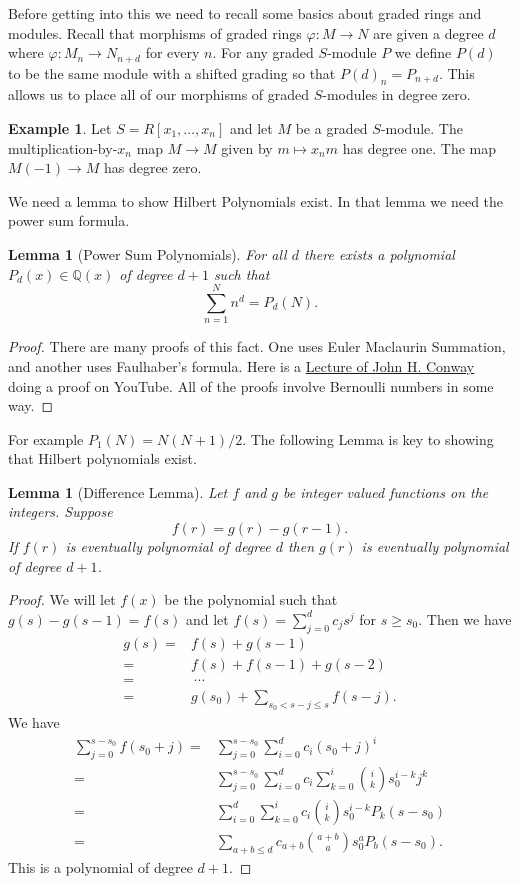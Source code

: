 \documentclass[12pt]{book}
\numberwithin{equation}{section}
\newtheorem{lemma}[theorem]{Lemma}
\theoremstyle{definition}
\newtheorem{example}[theorem]{Example}
\theoremstyle{remark}
\newcommand{\QQ}{\mathbb{Q}}
\begin{document}
Before getting into this we need to recall some basics about graded rings and modules.
Recall that morphisms of graded rings $\varphi:M\to N$ are given a degree $d$ where $\varphi: M_n \to N_{n+d}$ for every $n$. 
For any graded $S$-module $P$ we define $P(d)$ to be the same module with a shifted grading so that $P(d)_n = P_{n+d}$. 
This allows us to place all of our morphisms of graded $S$-modules in degree zero. 

\begin{example}
	Let $S = R[x_1,\ldots, x_n]$ and let $M$ be a graded $S$-module. 
	The multiplication-by-$x_n$ map $M \to M$ given by $m \mapsto x_n m$ has degree one. 
	The map $M(-1) \to M$ has degree zero. 
\end{example}

We need a lemma to show Hilbert Polynomials exist. 
In that lemma we need the power sum formula. 
\begin{lemma}[Power Sum Polynomials]
	For all $d$ there exists a polynomial $P_d(x) \in \QQ(x)$ of degree $d+1$ such that 
	$$ \sum_{n=1}^N n^d = P_d(N). $$
\end{lemma}
\begin{proof}
	There are many proofs of this fact. 
	One uses Euler Maclaurin Summation, and another uses Faulhaber's formula. 
	Here is a \href{https://www.youtube.com/watch?v=Uy1B_eGXQ0g}{Lecture of John H. Conway} doing a proof on YouTube.
	All of the proofs involve Bernoulli numbers in some way.
\end{proof}
For example $P_1(N) = N(N+1)/2$.
The following Lemma is key to showing that Hilbert polynomials exist. 
\begin{lemma}[Difference Lemma]\label{L:difference-lemma}
	Let $f$ and $g$ be integer valued functions on the integers. 
	Suppose  
	$$f(r) = g(r) - g(r-1).$$
	If $f(r)$ is eventually polynomial of degree $d$ then $g(r)$ is eventually polynomial of degree $d+1$. 
\end{lemma}
\begin{proof}
	We will let $f(x)$ be the polynomial such that $g(s) -g(s-1) = f(s)$ and let $f(s) = \sum_{j=0}^d c_j s^j$ for $s\geq s_0$. 
	Then we have 
	\begin{align*}
	g(s) =& f(s) + g(s-1) \\
	=& f(s) + f(s-1) + g(s-2) \\
	=& \ \cdots \\
	=& g(s_0) +\sum_{s_0 <s-j \leq s } f(s-j).
	\end{align*}
	We have 
	\begin{align*}
	\sum_{j=0}^{s-s_0} f(s_0+j) =& \sum_{j=0}^{s-s_0} \sum_{i=0}^d c_i (s_0+j)^i \\
	=& \sum_{j=0}^{s-s_0} \sum_{i=0}^d c_i \sum_{k=0}^i {i \choose k} s_0^{i-k} j^k \\
	=& \sum_{i=0}^d \sum_{k=0}^i c_i {i \choose k} s_0^{i-k} P_k(s-s_0) \\
	=& \sum_{a+b\leq d} c_{a+b} {a+b \choose a} s_0^{a} P_b(s-s_0). 
	\end{align*}
	This is a polynomial of degree $d+1$.
\end{proof}
\end{document}
